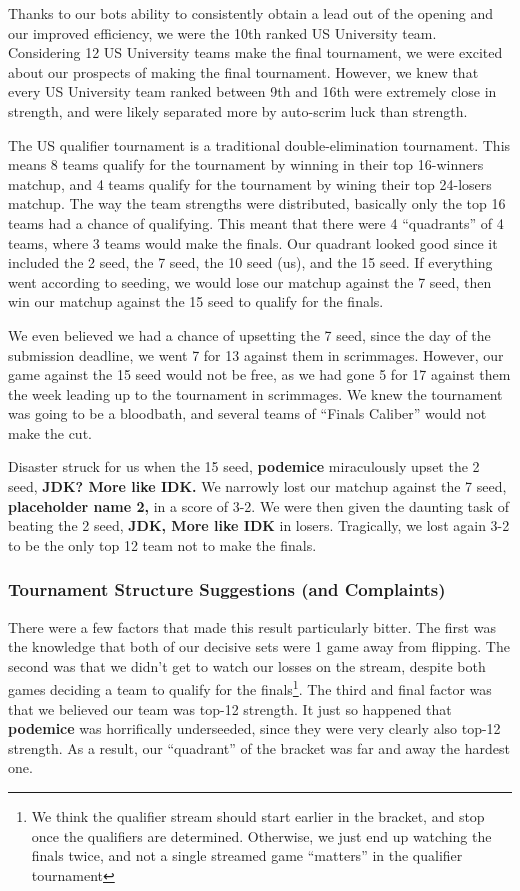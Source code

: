 Thanks to our bots ability to consistently obtain a lead out of the opening and our improved efficiency, we were the 10th ranked US University team. Considering 12 US University teams make the final tournament, we were excited about our prospects of making the final tournament. However, we knew that every US University team ranked between 9th and 16th were extremely close in strength, and were likely separated more by auto-scrim luck than strength.

\medskip

The US qualifier tournament is a traditional double-elimination tournament. This means 8 teams qualify for the tournament by winning in their top 16-winners matchup, and 4 teams qualify for the tournament by wining their top 24-losers matchup. The way the team strengths were distributed, basically only the top 16 teams had a chance of qualifying. This meant that there were 4 ``quadrants'' of 4 teams, where 3 teams would make the finals. Our quadrant looked good since it included the 2 seed, the 7 seed, the 10 seed (us), and the 15 seed. If everything went according to seeding, we would lose our matchup against the 7 seed, then win our matchup against the 15 seed to qualify for the finals.

\medskip

We even believed we had a chance of upsetting the 7 seed, since the day of the submission deadline, we went 7 for 13 against them in scrimmages. However, our game against the 15 seed would not be free, as we had gone 5 for 17 against them the week leading up to the tournament in scrimmages. We knew the tournament was going to be a bloodbath, and several teams of ``Finals Caliber'' would not make the cut.

\medskip

Disaster struck for us when the 15 seed, \textbf{podemice} miraculously upset the 2 seed, \textbf{JDK? More like IDK.} We narrowly lost our matchup against the 7 seed, \textbf{placeholder name 2,} in a score of 3-2. We were then given the daunting task of beating the 2 seed, \textbf{JDK, More like IDK} in losers. Tragically, we lost again 3-2 to be the only top 12 team not to make the finals.

\subsubsection{Tournament Structure Suggestions (and Complaints)}

There were a few factors that made this result particularly bitter. The first was the knowledge that both of our decisive sets were 1 game away from flipping. The second was that we didn't get to watch our losses on the stream, despite both games deciding a team to qualify for the finals\footnote{We think the qualifier stream should start earlier in the bracket, and stop once the qualifiers are determined. Otherwise, we just end up watching the finals twice, and not a single streamed game ``matters'' in the qualifier tournament}. The third and final factor was that we believed our team was top-12 strength. It just so happened that \textbf{podemice} was horrifically underseeded, since they were very clearly also top-12 strength. As a result, our ``quadrant'' of the bracket was far and away the hardest one.

